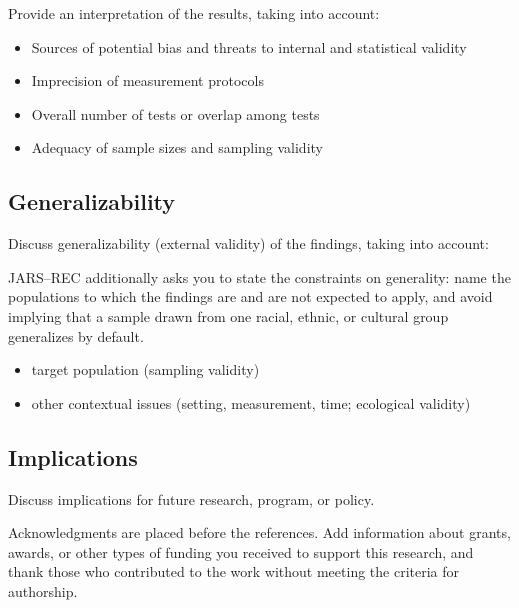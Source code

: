 \documentclass[acmsmall,screen,anonymous,review]{acmart}
\begin{document}
Provide an interpretation of the results, taking into account:

\begin{itemize}
    \item Sources of potential bias and threats to internal and statistical validity
    \item Imprecision of measurement protocols
    \item Overall number of tests or overlap among tests
    \item Adequacy of sample sizes and sampling validity
\end{itemize}


\subsection{Generalizability}

Discuss generalizability (external validity) of the findings, taking into account:

JARS--REC additionally asks you to state the constraints on generality: name the populations to which the findings are and are not expected to apply, and avoid implying that a sample drawn from one racial, ethnic, or cultural group generalizes by default.

\begin{itemize}
    \item target population (sampling validity)
    \item other contextual issues (setting, measurement, time; ecological validity)
\end{itemize}

\subsection{Implications}

Discuss implications for future research, program, or policy.

\begin{acks}
Acknowledgments are placed before the references. Add information about grants, awards, or other types of funding you received to support this research, and thank those who contributed to the work without meeting the criteria for authorship.
\end{acks}




\appendix
\end{document}
